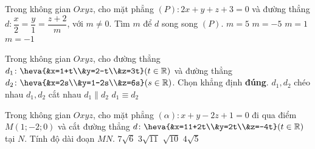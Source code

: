 	\begin{ex}%
	Trong không gian $Oxyz$, cho mặt phẳng $(P) \colon 2x+y+z+3=0$ và đường thẳng $d: \dfrac{x}{2}=\dfrac{y}{1}=\dfrac{z+2}{m}$, với $m\neq 0$. Tìm $m$ để $d$ song song $(P)$.
	\choice
	{$m=5 $}
	{\True $m=-5 $}
	{$m=1 $}
	{$m=-1 $}
	\end{ex}
	\begin{ex}%
	Trong không gian $Oxyz$, cho đường thẳng $d_1\colon \heva{&x=1+t\\&y=2-t\\&z=3t}(t\in \mathbb{R})$ và đường thẳng $d_2\colon \heva{&x=2s\\&y=1-2s\\&z=6s}(s\in \mathbb{R})$. Chọn khẳng định \textbf{đúng}.
	\choice
	{$d_1,d_2$ chéo nhau}
	{$d_1,d_2$ cắt nhau}
	{\True $d_1\parallel d_2$}
	{$d_1\equiv d_2$}
	\end{ex}
	\begin{ex}%
	Trong không gian $Oxyz$, cho mặt phẳng $(\alpha)\colon x+y-2z+1=0$ đi qua điểm $M(1;-2;0)$ và cắt đường thẳng $d\colon \heva{&x=11+2t\\&y=2t\\&z=-4t} (t\in \mathbb{R})$ tại $N$. Tính độ dài đoạn $MN$.
	\choice
	{$7\sqrt{6}$}
	{$3\sqrt{11}$}
	{$\sqrt{10}$}
	{\True $4\sqrt{5}$}
	\end{ex}
